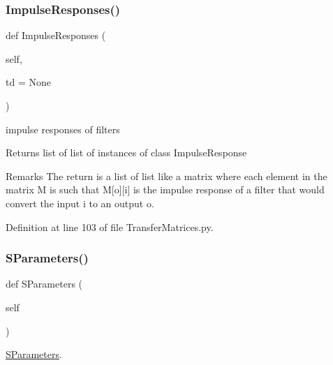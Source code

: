 \subsubsection{\texorpdfstring{Impulse\+Responses()}{ImpulseResponses()}}
{\footnotesize\ttfamily def Impulse\+Responses (\begin{DoxyParamCaption}\item[{}]{self,  }\item[{}]{td = {\ttfamily None} }\end{DoxyParamCaption})}



impulse responses of filters 

\begin{DoxyReturn}{Returns}
list of list of instances of class Impulse\+Response 
\end{DoxyReturn}
\begin{DoxyRemark}{Remarks}
The return is a list of list like a matrix where each element in the matrix M is such that M\mbox{[}o\mbox{]}\mbox{[}i\mbox{]} is the impulse response of a filter that would convert the input i to an output o. 
\end{DoxyRemark}


Definition at line 103 of file Transfer\+Matrices.\+py.

\mbox{\label{classSignalIntegrity_1_1FrequencyDomain_1_1TransferMatrices_1_1TransferMatrices_a5624dc56319957b00db2c962426e225e}} 
\subsubsection{\texorpdfstring{S\+Parameters()}{SParameters()}}
{\footnotesize\ttfamily def S\+Parameters (\begin{DoxyParamCaption}\item[{}]{self }\end{DoxyParamCaption})}



\hyperlink{namespaceSignalIntegrity_1_1SParameters}{S\+Parameters}. 

